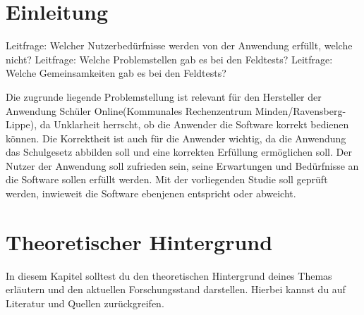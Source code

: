 \section{Einleitung}
Leitfrage: Welcher Nutzerbedürfnisse werden von der Anwendung erfüllt, welche nicht?
Leitfrage: Welche Problemstellen gab es bei den Feldtests?
Leitfrage: Welche Gemeinsamkeiten gab es bei den Feldtests?

Die zugrunde liegende Problemstellung ist relevant für den Hersteller der Anwendung \glqq Schüler Online\grqq{}(\glqq Kommunales Rechenzentrum Minden/Ravensberg-Lippe\grqq{}), da Unklarheit herrscht, ob die Anwender die Software korrekt bedienen können. Die Korrektheit ist auch für die Anwender wichtig, da die Anwendung das Schulgesetz abbilden soll und eine korrekten Erfüllung ermöglichen soll. Der Nutzer der Anwendung soll zufrieden sein, seine Erwartungen und Bedürfnisse an die Software sollen erfüllt werden. Mit der vorliegenden Studie soll geprüft werden, inwieweit die Software ebenjenen entspricht oder abweicht.

\section{Theoretischer Hintergrund}
In diesem Kapitel solltest du den theoretischen Hintergrund deines Themas erläutern und den aktuellen Forschungsstand darstellen. Hierbei kannst du auf Literatur und Quellen zurückgreifen.


